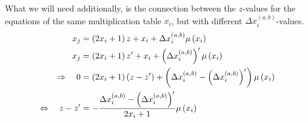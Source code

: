 What we will need additionally, is the connection between the $z$-values for the equations of the same multiplication table $x_{i}$, but with different $\Delta x_{i}^{\left(a,b\right)}$-values.
\begin{alignat}{3}
	x_{j} &= \left(2x_{i} + 1\right)z + x_{i} + \Delta x_{i}^{\left(a,b\right)}\mu\left(x_{i}\right) \notag \\
	x_{j} &= \left(2x_{i} + 1\right)z^{\prime} + x_{i} + \left(\Delta x_{i}^{\left(a,b\right)}\right)^{\prime}\mu\left(x_{i}\right) \notag \\ 
	\Rightarrow \quad 0 &= \left(2x_{i} + 1\right)\left(z - z^{\prime}\right) + \left(\Delta x_{i}^{\left(a,b\right)} - \left(\Delta x_{i}^{\left(a,b\right)}\right)^{\prime}\right)\mu\left(x_{i}\right) \notag \\
	\Leftrightarrow \quad z - z^{\prime} &= - \frac{\Delta x_{i}^{\left(a,b\right)} - \left(\Delta x_{i}^{\left(a,b\right)}\right)^{\prime}}{2x_{i} + 1} \mu\left(x_{i}\right) \label{eq:differentDeltaxforsamexi}
\end{alignat}




